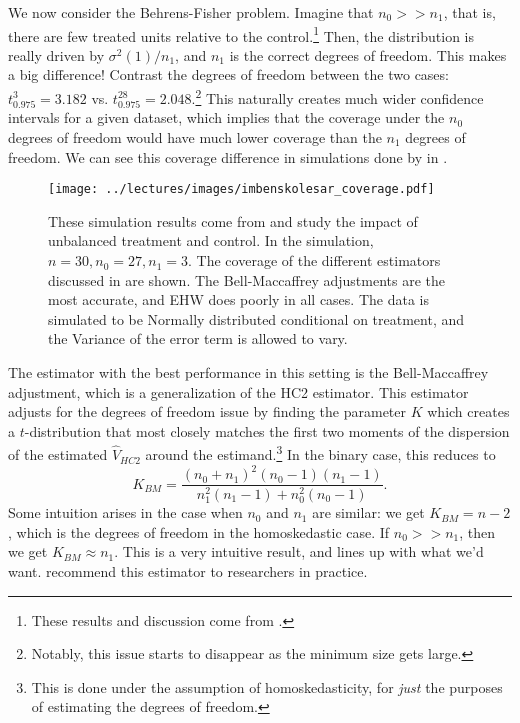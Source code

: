 \documentclass{tufte-handout}
\theoremstyle{break}
\begin{document}
We now consider the Behrens-Fisher problem. Imagine that $n_{0} >> n_{1}$, that is, there are few treated units relative to the control.\footnote{These results and discussion come from \citet{imbens2016robust}.}  Then, the distribution is really driven by $\sigma^{2}(1)/n_{1}$, and $n_{1}$ is the correct degrees of freedom. This makes a big difference! Contrast the degrees of freedom between the two cases: $t^{3}_{0.975} = 3.182$  vs. $t^{28}_{0.975}=2.048$.\footnote{Notably, this issue starts to disappear as the minimum size  gets large.} This naturally creates much wider confidence intervals for a given dataset, which implies that the coverage under the $n_{0}$ degrees of freedom would have much lower coverage than the $n_{1}$ degrees of freedom. We can see this coverage difference in simulations done by \citet{imbens2016robust} in .
      

\begin{figure}
  \label{fig:imbenskolesar_simulation}
    \texttt{[image: ../lectures/images/imbenskolesar\_coverage.pdf]}
    \caption{
      These simulation results come from \citet{imbens2016robust} and study the impact of unbalanced treatment and control. In the simulation, $n=30, n_{0} = 27, n_{1} = 3$. The coverage of the different estimators discussed in  are shown. The Bell-Maccaffrey adjustments are the most accurate, and EHW does poorly in all cases. The data is simulated to be Normally distributed conditional on treatment, and the Variance of the error term is allowed to vary.
      }
    \end{figure}
 
The estimator with the best performance in this setting is the Bell-Maccaffrey adjustment, which is a generalization of the HC2 estimator. This estimator adjusts for the degrees of freedom issue by finding the parameter $K$ which creates a $t$-distribution that most closely matches the first two moments of the dispersion of the estimated $\hat{V}_{HC2}$ around the estimand.\footnote{This is done under the assumption of homoskedasticity, for \emph{just} the purposes of estimating the degrees of freedom.} In the binary case, this reduces to 
\begin{equation*}
  K_{BM} = \frac{(n_{0} + n_{1})^{2}(n_{0}-1)(n_{1}-1)}{n_{1}^{2}(n_{1}-1)+n_{0}^{2}(n_{0}-1)}.
\end{equation*} 
Some intuition arises in the case when $n_{0}$ and $n_{1}$ are similar: we get $K_{BM} = n-2$, which is the degrees of freedom in the homoskedastic case. If $n_{0} >> n_{1}$, then we get $K_{BM}  \approx n_{1}$. This is a very intuitive result, and lines up with what we'd want. \citet{imbens2016robust} recommend this estimator to researchers in practice.
\end{document}
